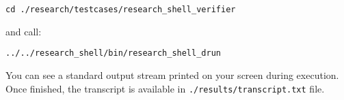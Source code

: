 \texttt{cd ./research/testcases/research\_shell\_verifier}

\noindent and call:

\texttt{../../research\_shell/bin/research\_shell\_drun}

You can see a standard output stream printed on your screen during execution. Once finished, the transcript is available in \texttt{./results/transcript.txt} file. 


